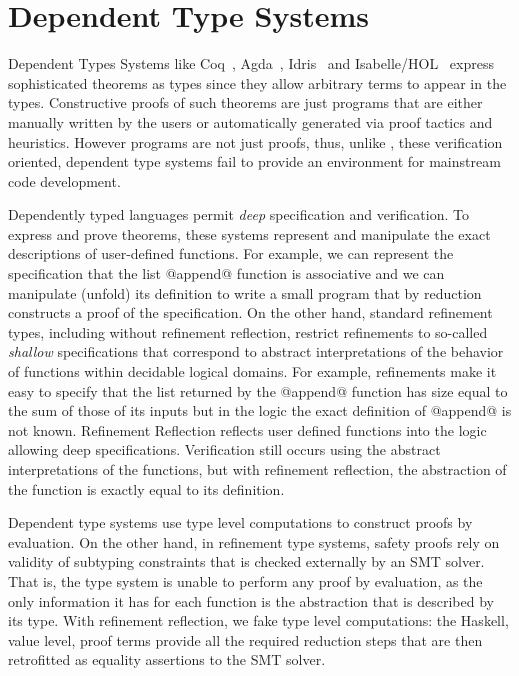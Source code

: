\section{Dependent Type Systems}\label{related:dependenttypes}


Dependent Types Systems like Coq~\cite{coq-book}, 
Agda~\cite{norell07}, Idris~\cite{Brady13} and Isabelle/HOL~\cite{isabelle}
express sophisticated theorems as types since they 
allow arbitrary terms to appear in the types.
%
Constructive proofs of such theorems are just programs
that are either manually written by the users or automatically generated via 
proof tactics and heuristics.
However programs are not just proofs, 
thus, unlike \toolname, these verification oriented, dependent type systems
fail to provide an environment for mainstream code development. 

Dependently typed languages permit
\textit{deep} specification and verification. 
%
To express and prove theorems, these systems
represent and manipulate the exact
descriptions of user-defined functions. 
%
For example, we can represent
the specification that the list @append@ function is associative and
we can manipulate (unfold) its definition 
to write a small program that by reduction
constructs a proof of the specification.
%
On the other hand, 
standard refinement types, including \toolname without refinement reflection,  
restrict refinements to so-called  \textit{shallow}
specifications that correspond to abstract interpretations of
the behavior of functions within decidable logical domains. 
%
For example, refinements make it easy
to specify that the list returned by the @append@ function has size
equal to the sum of those of its inputs
but in the logic the exact definition of @append@ is not known. 
%
Refinement Reflection reflects user defined functions into the logic
allowing deep specifications. 
Verification still occurs using the abstract interpretations of the functions, 
but with refinement reflection, the abstraction of the function is 
exactly equal to its definition. 

Dependent type systems use type level computations to construct proofs by evaluation. 
%
On the other hand, in refinement type systems, 
safety proofs rely on validity of subtyping constraints 
that is checked externally by an SMT solver. 
%
That is, the type system is unable to perform any proof by evaluation, 
as the only information it has for each function is the abstraction that is 
described by its type.
%
With refinement reflection, we fake type level computations: 
the Haskell, value level, proof terms provide all the required reduction steps
that are then retrofitted as equality assertions to the SMT solver.


